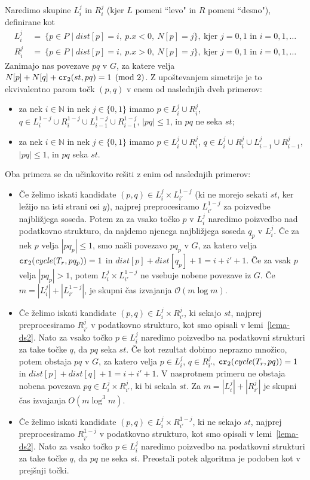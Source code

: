 \documentclass[a4paper, 12pt]{book}
\newcommand{\NN}{\ensuremath{\mathbb N}}  %
\newcommand{\OO}{\ensuremath{\mathcal{O}}} %
\def\dist{\mathit{dist}}
\newcommand{\cycle}{\mathit{cycle}}
\newcommand\CR{\mbox{\tt cr}_2}		  %
\begin{document}
Naredimo skupine $L_i^j$ in $R_i^j$ (kjer $L$ pomeni ``levo" in $R$ pomeni ``desno"), definirane kot
\begin{align*}
	L_i^j ~&=~ \{ p\in P \mid \dist[p]=i,~ p.x<0,~ N[p]=j \} ,
	~\text{kjer $j=0,1$ in $i=0,1,\dots$}\\
	R_i^j ~&=~ \{ p\in P \mid \dist[p]=i,~ p.x>0,~ N[p]=j \} ,
	~\text{kjer $j=0,1$ in $i=0,1,\dots$}
\end{align*}
Zanimajo nas povezave $pq$ v $G$, za katere velja $N[p]+N[q]+\CR(st,pq)=1 \pmod 2$. Z upoštevanjem simetrije je to ekvivalentno parom točk $(p, q)$ v enem od naslednjih dveh primerov:
\begin{itemize}
	\item za nek $i\in \NN$ in nek $j\in \{0,1\}$ imamo
			$p\in L_i^j\cup R_i^j$, 
			$q\in L_i^{1-j}\cup R_i^{1-j}\cup L_{i-1}^{1-j}\cup R_{i-1}^{1-j}$, 
			$|pq|\le 1$, in $pq$ ne seka $st$;
	\item za nek $i\in \NN$ in nek $j\in \{0,1\}$ imamo
			$p\in L_i^j\cup R_i^j$, 
			$q\in L_i^{j}\cup R_i^{j}\cup L_{i-1}^{j}\cup R_{i-1}^{j}$, 
			$|pq|\le 1$, in $pq$ seka $st$.
\end{itemize}
Oba primera se da učinkovito rešiti z enim od naslednjih primerov:
\begin{itemize}
\item Če želimo iskati kandidate $(p,q)\in L_i^j\times L_{i'}^{1-j}$ (ki ne morejo sekati $st$, ker ležijo na isti strani osi $y$), najprej preprocesiramo $L_{i'}^{1-j}$ za poizvedbe najbližjega soseda. Potem za za vsako točko $p$ v $L_i^j$ naredimo poizvedbo nad podatkovno strukturo, da najdemo njenega najbližjega soseda $q_p$ v $L_i^j$. Če za nek $p$ velja $|pq_p|\le 1$, smo našli povezavo $pq_p$ v $G$, za katero velja $\CR(\cycle(T_r,pq_p))=1$ in $\dist[p]+\dist[q_p]+1=i+i'+1$. Če za vsak $p$ velja $|pq_p|> 1$, potem $L_i^j\times L_{i'}^{1-j}$ ne vsebuje nobene povezave iz $G$. Če $m=|L_i^j|+|L_{i'}^{1-j}|$, je skupni čas izvajanja $\OO(m\log m)$.
\item Če želimo iskati kandidate $(p,q)\in L_i^j\times R_{i'}^{j}$, ki sekajo $st$, najprej preprocesiramo $R_{i'}^{j}$ v podatkovno strukturo, kot smo opisali v lemi~\ref{lema-ds2}. Nato za vsako točko $p\in L_i^j$ naredimo poizvedbo na podatkovni strukturi za take točke $q$, da $pq$ seka $st$. Če kot rezultat dobimo neprazno množico, potem obstaja $pq$ v $G$, za katero velja $p\in L_i^j$, $q\in R_{i'}^{j}$, $\CR(\cycle(T_r,pq))=1$ in $\dist[p]+\dist[q]+1=i+i'+1$. V nasprotnem primeru ne obstaja nobena povezava $pq\in L_i^j\times R_{i'}^{j}$, ki bi sekala $st$. Za $m=|L_i^j|+|R_{i'}^{j}|$ je skupni čas izvajanja  $O(m\log^3 m)$.
\item Če želimo iskati kandidate $(p,q)\in L_i^j\times R_{i'}^{1-j}$, ki ne sekajo $st$, najprej preprocesiramo $R_{i'}^{1-j}$ v podatkovno strukturo, kot smo opisali v lemi~\ref{lema-ds2}. Nato za vsako točko $p\in L_i^j$ naredimo poizvedbo na podatkovni strukturi za take točke $q$, da $pq$ ne seka $st$. Preostali potek algoritma je podoben kot v prejšnji točki. 
\end{itemize}
\end{document}
